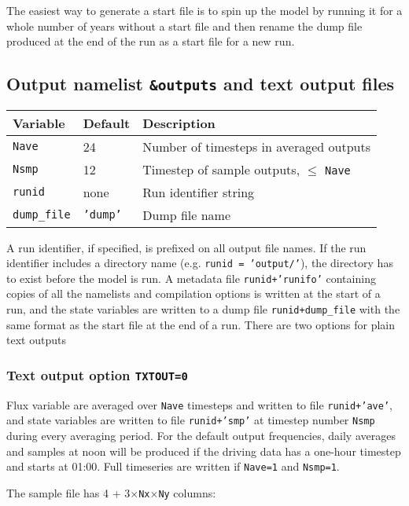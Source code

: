 \documentclass{article}
\begin{document}
The easiest way to generate a start file is to spin up the model by running it for a whole number of years without a start file and then rename the dump file produced at the end of the run as a start file for a new run.

\subsection{Output namelist {\tt \&outputs} and text output files}

\begin{longtable}{|l|l|l|}
\hline
Variable & Default & Description \\
\hline
{\tt Nave}       & 24           & Number of timesteps in averaged outputs       \\
{\tt Nsmp}       & 12           & Timestep of sample outputs, $\leq$ {\tt Nave} \\
{\tt runid}      & none         & Run identifier string                         \\
{\tt dump\_file} & {\tt 'dump'} & Dump file name                                \\
\hline 
\end{longtable}

A run identifier, if specified, is prefixed on all output file names. If the run identifier includes a directory name (e.g. {\tt runid = 'output/'}), the directory has to exist before the model is run. A metadata file {\tt runid+'runifo'} containing copies of all the namelists and compilation options is written at the start of a run, and the state variables are written to a dump file {\tt runid+dump\_file} with the same format as the start file at the end of a run. There are two options for plain text outputs

\subsubsection{Text output option {\tt TXTOUT=0}}
Flux variable are averaged over {\tt Nave} timesteps and written to file {\tt runid+'ave'}, and state variables are written to file {\tt runid+'smp'} at timestep number {\tt Nsmp} during every averaging period. For the default output frequencies, daily averages and samples at noon will be produced if the driving data has a one-hour timestep and starts at 01:00. Full timeseries are written if {\tt Nave=1} and {\tt Nsmp=1}. 

The sample file has 4 + 3$\times${\tt Nx$\times$Ny} columns:
\end{document}
